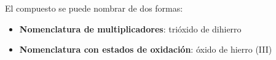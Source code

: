 \begin{example}
    El compuesto  se puede nombrar de dos formas:
    \begin{itemize}
        \item \textbf{Nomenclatura de multiplicadores}: trióxido de dihierro
        \item \textbf{Nomenclatura con estados de oxidación}: óxido de hierro (III)
    \end{itemize}
\end{example}

%
%
%
%
%
%
%
